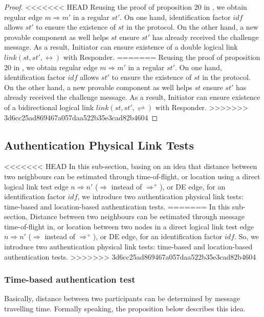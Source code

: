 \begin{flushleft}
\begin{flushleft}
\begin{Definition}
\begin{itemize}
\begin{Definition}
\begin{proof}
<<<<<<< HEAD
Reusing the proof of proposition 20 in \cite{Guttman:2002:ATS:568264.568267}, we obtain regular edge $m \Rightarrow m'$ in a regular $st'$. On one hand, identification factor $idf$ allows $st'$ to ensure the existence of $st$ in the protocol. On the other hand, a new provable component as well helps $st$ ensure $st'$ has already received the challenge message. As a result, Initiator can ensure existence of a double logical link $link(st,st',\leftrightarrow)$ with Responder. 
=======
Reusing the proof of proposition 20 in \cite{Guttman:2002:ATS:568264.568267}, we obtain regular edge $m \Rightarrow m'$ in a regular $st'$. On one hand, identification factor $idf$ allows $st'$ to ensure the existence of $st$ in the protocol. On the other hand, a new provable component as well helps $st$ ensure $st'$ has already received the challenge message. As a result, Initiator can ensure existence of a bidirectional logical link $link(st,st',\rightleftharpoons)$ with Responder. 
>>>>>>> 3d6cc25ad869467a057daa522b35e3cad82b4604
\end{proof}

\subsection{Authentication Physical Link Tests}

<<<<<<< HEAD
In this sub-section, basing on an idea that distance between two neighbours can be estimated through time-of-flight, or location using a direct logical link test edge $n \Rightarrow n'$ ($\Rightarrow$ instead of $\Rightarrow^+$), or DE edge, for an identification factor $idf$, we introduce two authentication physical link tests: time-based and location-based authentication tests.
=======
In this sub-section, Distance between two neighbours can be estimated through message time-of-flight in, or location between two nodes in a direct logical link test edge $n \Rightarrow n'$ ($\Rightarrow$ instead of $\Rightarrow^+$), or DE edge, for an identification factor $idf$. So, we introduce two authentication physical link tests: time-based and location-based authentication tests. 
>>>>>>> 3d6cc25ad869467a057daa522b35e3cad82b4604

\subsubsection*{Time-based authentication test}

Basically, distance between two participants can be determined by message travelling time. Formally speaking, the proposition below describes this idea.


\end{Definition}
\end{itemize}
\end{Definition}
\end{flushleft}
\end{flushleft}
